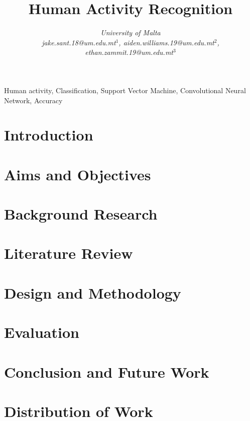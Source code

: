 \documentclass[conference]{IEEEtran}
\begin{document}
\title{Human Activity Recognition}

\author{
\textit{University of Malta}\\
\textit{jake.sant.18@um.edu.mt$^{1}$, aiden.williams.19@um.edu.mt$^{2}$, ethan.zammit.19@um.edu.mt$^{3}$}}

  \maketitle

  \begin{IEEEkeywords}
    Human activity, Classification, Support Vector Machine, Convolutional Neural Network, Accuracy

  \end{IEEEkeywords}

  \section{Introduction}
    

  \section{Aims and Objectives}
       

  \section{Background Research}
    

  \section{Literature Review}
    

  \section{Design and Methodology}
    \label{Design}
    

  \section{Evaluation}
  \label{Evaluation}
    

  \section{Conclusion and Future Work}
  \label{Conclusion}
    

  \section{Distribution of Work}
  \label{Distribution}
    

  
  
\end{document}
